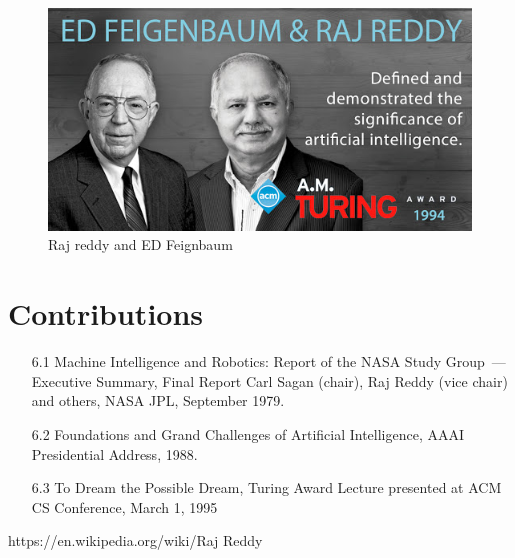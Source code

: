 \documentclass[a4paper,10pt]{article}
\begin{document}
\begin{figure}[!hbt]
  \centering
  \includegraphics[scale=0.8]{rajco.jpg}
  \caption{Raj reddy and ED Feignbaum}
\end{figure}

\section{Contributions}
 \begin{enumerate}
  \item[6.1] Machine Intelligence and Robotics: Report of the NASA Study Group —
  Executive Summary, Final Report Carl Sagan (chair), Raj Reddy (vice chair) 
  and others, NASA JPL, September 1979.
  \item[6.2] Foundations and Grand Challenges of Artificial Intelligence, AAAI 
  Presidential Address, 1988.
  \item[6.3] To Dream the Possible Dream, Turing Award Lecture presented at ACM 
  CS Conference, March 1, 1995 
 \end{enumerate}

\begin{thebibliography}{10}
 https://en.wikipedia.org/wiki/Raj Reddy
\end{thebibliography}
\end{document}
